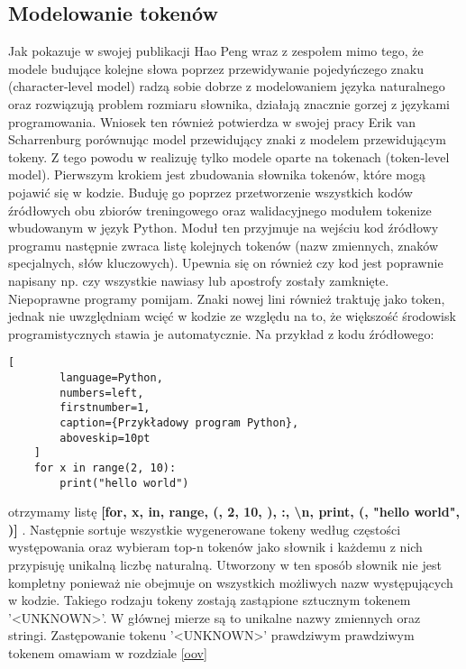 \subsection{Modelowanie tokenów}
Jak pokazuje w swojej publikacji Hao Peng wraz z zespołem \cite{character-level} mimo tego, że modele budujące kolejne słowa poprzez 
przewidywanie pojedyńczego znaku (character-level model) radzą sobie dobrze z modelowaniem języka naturalnego oraz rozwiązują problem rozmiaru słownika, 
działają znacznie gorzej z językami programowania. Wniosek ten również potwierdza w swojej pracy Erik van Scharrenburg \cite{erik} porównując model przewidujący 
znaki z modelem przewidującym tokeny. Z tego powodu w  realizuję tylko modele oparte na tokenach (token-level model). 
Pierwszym krokiem jest zbudowania słownika tokenów, które mogą pojawić się w kodzie. Buduję go poprzez przetworzenie wszystkich kodów źródłowych obu zbiorów treningowego oraz 
walidacyjnego modułem tokenize \cite{tokenize} wbudowanym w język Python. Moduł ten przyjmuje na wejściu kod źródłowy programu następnie zwraca listę kolejnych tokenów (nazw zmiennych, 
znaków specjalnych, słów kluczowych). Upewnia się on również czy kod jest poprawnie napisany np. czy wszystkie nawiasy lub apostrofy zostały zamknięte. Niepoprawne programy pomijam. 
Znaki nowej lini również traktuję jako token, jednak nie uwzględniam wcięć w kodzie ze względu na to, że większość środowisk programistycznych stawia je 
automatycznie. Na przykład z kodu źródłowego: 
\begin{addmargin}[10mm]{0mm}
    \begin{lstlisting}[
        language=Python,
        numbers=left,
        firstnumber=1,
        caption={Przykładowy program Python},
        aboveskip=10pt
    ]
    for x in range(2, 10): 
        print("hello world")
    \end{lstlisting}
    \end{addmargin}
otrzymamy listę \textbf{ [for, x, in, range, (, 2, 10, ), :, \textbackslash n, print, (, "hello world", )] }.
Następnie sortuje wszystkie wygenerowane tokeny według częstości występowania oraz wybieram top-n tokenów jako słownik i każdemu z nich przypisuję unikalną liczbę naturalną. 
Utworzony w ten sposób słownik nie jest kompletny ponieważ nie obejmuje on wszystkich możliwych nazw występujących w kodzie. Takiego rodzaju tokeny
zostają zastąpione sztucznym tokenem '<UNKNOWN>'. W głównej mierze są to unikalne nazwy zmiennych oraz stringi. Zastępowanie tokenu '<UNKNOWN>' prawdziwym prawdziwym tokenem omawiam w 
rozdziale \ref{oov}

